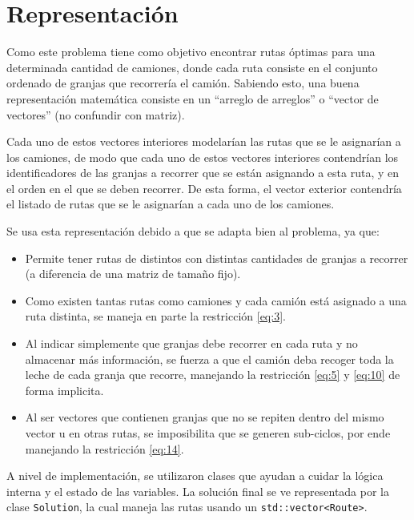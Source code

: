 \section{Representación}


Como este problema tiene como objetivo encontrar rutas óptimas para una determinada cantidad de camiones, donde cada ruta consiste en el conjunto ordenado de granjas que recorrería el camión. Sabiendo esto, una buena representación matemática consiste en un ``arreglo de arreglos'' o ``vector de vectores'' (no confundir con matriz). 

Cada uno de estos vectores interiores modelarían las rutas que se le asignarían a los camiones, de modo que cada uno de estos vectores interiores contendrían los identificadores de las granjas a recorrer que se están asignando a esta ruta, y en el orden en el que se deben recorrer. De esta forma, el vector exterior contendría el listado de rutas que se le asignarían a cada uno de los camiones.

Se usa esta representación debido a que se adapta bien al problema, ya que:
\begin{itemize}
    \item Permite tener rutas de distintos con distintas cantidades de granjas a recorrer (a diferencia de una matriz de tamaño fijo).
    \item Como existen tantas rutas como camiones y cada camión está asignado a una ruta distinta, se maneja en parte la restricción \ref{eq:3}.
    \item Al indicar simplemente que granjas debe recorrer en cada ruta y no almacenar más información, se fuerza a que el camión deba recoger toda la leche de cada granja que recorre, manejando la restricción \ref{eq:5} y \ref{eq:10} de forma implicita.
    \item Al ser vectores que contienen granjas que no se repiten dentro del mismo vector u en otras rutas, se imposibilita que se generen sub-ciclos, por ende manejando la restricción \ref{eq:14}.
\end{itemize}

A nivel de implementación, se utilizaron clases que ayudan a cuidar la lógica interna y el estado de las variables. La solución final se ve representada por la clase \texttt{Solution}, la cual maneja las rutas usando un \texttt{std::vector<Route>}.

